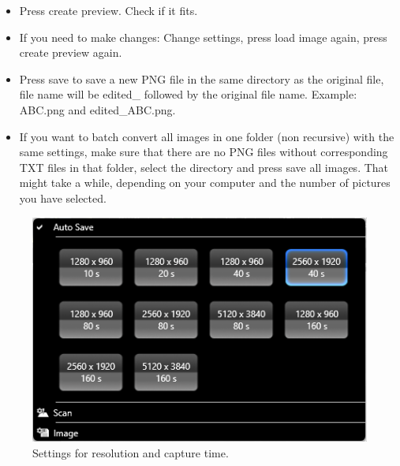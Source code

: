 \documentclass[english]{scrartcl}
\begin{document}
\begin{enumerate}
\begin{itemize}
\begin{itemize}
\begin{itemize}
						\item x and y. Those values allow you to shift the background and information to the right (x) and up (y).\footnote{If you add box below image is enabled, then those values shift everything to the right and down.} Standard values: 50.
					\end{itemize}
					Scalebar:
					\begin{itemize}
						\item Height of bar: Sets the height of the scale bar. Standard value: 50.
						\item Width scaling factor: Scales the width of the scale bar. So if image meta-data from TXT file contains the information for a \SI{10}{\micro\metre} scale bar, then a \SI{20}{\micro\metre} scale bar would be displayed if you select a factor of 2 here.\footnote{This allows you to display the same length of scale bar, even if you have taken images with different magnification. No unit conversion will be made, so a scaling factor of 10 with a scale bar information of \SI{100}{\nano\metre} will result in a \SI{1000}{\nano\metre} scale bar, not in a \SI{1}{\micro\metre} one!}
						\item Precision: If you select a width scaling factor different from one, you might get numbers that require more decimal digits. To display those, increase the Precision. Standard value: 0 (no decimal digits).
					\end{itemize}
			\end{itemize}
		\item Press create preview. Check if it fits.
		\item If you need to make changes: Change settings, press load image again, press create preview again.
		\item Press save to save a new PNG file in the same directory as the original file, file name will be edited\_ followed by the original file name. Example: ABC.png and edited\_ABC.png.
		\item If you want to batch convert all images in one folder (non recursive) with the same settings, make sure that there are no PNG files without corresponding TXT files in that folder, select the directory and press save all images. That might take a while, depending on your computer and the number of pictures you have selected.
	\end{itemize}
\end{enumerate}
\begin{figure}[htbp]
	\centering
	\includegraphics[width=.6\textwidth]{manual_1}
	\caption{Settings for resolution and capture time.}
	\label{fig:manual_1}
\end{figure}
\end{document}
